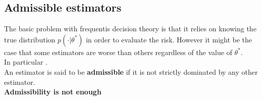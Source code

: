\subsection{Admissible estimators}
The basic problem with frequentis decision theory is that it relies on knowing the true
distribution $p(\cdot|\theta^{*})$ in order to evaluate the risk. However it might be 
the case that some estimators are worse than others regardless of the value of 
$\theta^{*}$.\\
In particular .\\
An estimator is said to be \textbf{admissible} if it is not strictly dominated by any 
other estimator.\\
\textbf{Admissibility is not enough}
